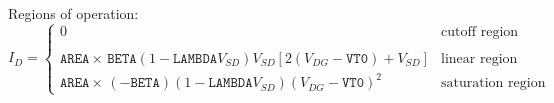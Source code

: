 \documentclass{article}
\begin{document}
\\

Regions of operation:
\newline
{}\\
\begin{equation}
I_{D} = \left\{ \begin{array}{ll}
      0  & \mbox{cutoff region} \\ \\
      \texttt{AREA}\times \,\texttt{BETA} \left(1 - \texttt{LAMBDA} V_{SD}\right)V_{SD}
      \left[2\left(V_{DG}- \texttt{VT0}\right)+V_{SD}\right]
         &\mbox{linear region}\\
      \texttt{AREA} \times \,(-\texttt{BETA}) \left(1 - \texttt{LAMBDA} V_{SD}\right)
      \left(V_{DG} - \texttt{VT0}\right)^2
         &\mbox{saturation region} \end{array} \right. %
\end{equation}\\
\end{document}
